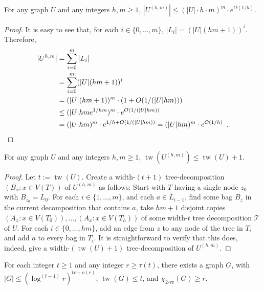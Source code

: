 \documentclass[kpfonts]{patmorin}
\DeclareMathOperator{\tw}{tw}
\newcommand{\rn}[1]{\chi_{\operatorname{#1-vr}}}
\newcommand{\trn}{\rn{2}}
\theoremstyle{named}
\begin{document}
\begin{lem}\label{boost-size}
    For any graph $U$ and any integers $h,m \ge 1$, $|U^{(h,m)}| \le (|U|\cdot h\cdot m)^{m}\cdot e^{O(1/h)}$.
\end{lem}

\begin{proof}
    It is easy to see that, for each $i\in \{0,\ldots,m\}$, $|L_i|=(|U|(hm+1))^i$.  Therefore,
    \begin{align*}
      |U^{h,m}|
        & = \sum_{i=0}^m |L_i| \\
        & = \sum_{i=0}^m (|U|(hm+1))^i \\
        & = (|U|(hm+1))^{m}\cdot (1+O(1/(|U|hm))) \\
        & \le (|U|hme^{1/hm})^{m}\cdot e^{O(1/(|U|hm))} \\
        & = (|U|hm)^{m}\cdot e^{1/h+O(1/(|U|hm))} = (|U|hm)^{m}\cdot e^{O(1/h)}
        \enspace . \qedhere
    \end{align*}
\end{proof}


\begin{lem}\label{boost-treewidth}
    For any graph $U$ and any integers $h,m\ge 1$, $\tw(U^{(h,m)})\le \tw(U)+1$.
\end{lem}

\begin{proof}
  Let $t:=\tw(U)$.
  Create a width-$(t+1)$ tree-decomposition $(B_x:x\in V(T))$ of $U^{(h,m)}$ as follows: Start with $T$ having a single node $z_0$ with $B_{z_0}=L_0$.  For each $i\in\{1,\ldots,m\}$, and each $a\in L_{i-1}$, find some bag $B_z$ in the current decomposition that contains $a$, take $hm+1$ disjoint copies $(A_x:x\in V(T_0)),\ldots,(A_x:x\in V(T_h))$ of some width-$t$ tree decomposition $\mathcal{T}$ of $U$.  For each $i\in\{0,\ldots,hm\}$, add an edge from $z$ to any node of the tree in $T_i$ and add $a$ to every bag in $T_i$.  It is straightforward to verify that this does, indeed, give a width-$(\tw(U)+1)$ tree-decomposition of $U^{(h,m)}$.
\end{proof}


\begin{lem}\label{treewidth-lower-bound}
    For each integer $t\ge 1$ and any integer $r\ge \tau(t)$, there exists a graph $G$, with $|G|\le (\log^{(t-1)}r)^{tr + o(r)}$, $\tw(G)\le t$, and $\trn(G)\ge r$.
\end{lem}
\end{document}
